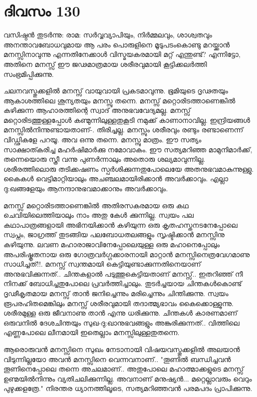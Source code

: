  
\section{ദിവസം 130}


വസിഷ്ഠന്‍ തുടര്‍ന്നു: രാമ: സര്‍വ്വവ്യാപിയും, നിര്‍മ്മലവും, ശാശ്വതവും അനന്താവബോധവുമായ ആ പരം പൊരുളിനെ മൂടുപടംകൊണ്ടു മറയ്ക്കാന്‍ മനസ്സിനാവുന്നു എന്നതിനേക്കാള്‍ വിസ്മയകരമായി മറ്റ്‌ എന്തുണ്ട്‌? എന്നിട്ടോ, അതിനെ മനസ്സ്‌ ഈ ജഢമാത്രമായ ശരീരവുമായി കൂട്ടിക്കലര്‍ത്തി സംഭ്രമിപ്പിക്കുന്നു.

ചലനവസ്തുക്കളില്‍ മനസ്സ്‌ വായുവായി പ്രകടമാവുന്നു. ഭൂമിയുടെ ദൃഢതയും ആകാശത്തിലെ ശൂന്യതയും മനസ്സു തന്നെ. മനസ്സ്‌ മറ്റൊരിടത്താണെങ്കില്‍ കഴിക്കുന്ന ആഹാരത്തിന്റെ സ്വാദ്‌ അനുഭവവേദ്യമല്ല. മനസ്സ്‌ മറ്റൊരിടത്തുള്ളപ്പോള്‍ കണ്മുന്നിലുള്ളതുകൂടി നമുക്ക്‌ കാണാനാവില്ല. ഇന്ദ്രിയങ്ങള്‍ മനസ്സില്‍നിന്നുണ്ടായതാണ്‌-. തിരിച്ചല്ല. മനസ്സും ശരീരവും രണ്ടും രണ്ടാണെന്ന് വിഡ്ഢികളേ പറയൂ. അവ ഒന്നു തന്നെ. മനസ്സു മാത്രം. ഈ സത്യം സാക്ഷാത്കരിച്ച മഹര്‍ഷിമാര്‍ക്കു നമോവാകം. ഈ സത്യമറിഞ്ഞ മാമുനിമാര്‍ക്ക്‌, തന്നെയൊരു സ്ത്രീ വന്നു പുണര്‍ന്നാലും അതൊരു ശല്യമാവുന്നില്ല. ശരീരത്തിലൊരു തടിക്കഷണം സ്പര്‍ശിക്കുന്നതുപോലെയേ അതനുഭവമാകുന്നുള്ളു. കൈകള്‍ വെട്ടിമാറ്റിയാലും അചഞ്ചലമായിരിക്കാന്‍ അവര്‍ക്കാവും. എല്ലാ ദു:ഖങ്ങളേയും ആനന്ദാനുഭവമാക്കാനും അവര്‍ക്കാവും.

മനസ്സ്‌ മറ്റൊരിടത്താണെങ്കില്‍ അതിരസകരമായ ഒരു കഥ ചെവിയിലെത്തിയാലും നാം അതു കേള്‍ ക്കുന്നില്ല. സ്വയം പല കഥാപാത്രങ്ങളായി അഭിനയിക്കാന്‍ കഴിയുന്ന ഒരു കൃതഹസ്തനടനേപ്പോലെ സ്വപ്നം, ജാഗ്രത്ത്‌ തുടങ്ങിയ പലബോധതലങ്ങളും സൃഷ്ടിക്കാന്‍ മനസ്സിനു കഴിയുന്നു. ലവണ മഹാരാജാവിനേപ്പോലെയുള്ള ഒരു മഹാനെപ്പോലും അപരിഷ്കൃതനായ ഒരു ഗോത്രവര്‍ഗ്ഗക്കാരനായി മാറ്റാന്‍ മനസ്സിനെത്രവേഗമാണു സാധിച്ചത്‌!!. മനസ്സ്‌ സ്വന്തമായി കെട്ടിയുണ്ടാക്കുന്നതിനെയാണ്‌ അനുഭവിക്കുന്നത്‌.. ചിന്തകളാല്‍ പടുത്തുകെട്ടിയതാണ്‌ മനസ്സ്‌.. ഇതറിഞ്ഞ്‌ നീ നിനക്ക്‌ ബോധിച്ചതുപോലെ പ്രവര്‍ത്തിച്ചാലും. തുടര്‍ച്ചയായ ചിന്തകള്‍കൊണ്ട്‌ ദൃഢീകൃതമായ മനസ്സ്‌ താന്‍ ജനിച്ചെന്നും മരിച്ചെന്നും ചിന്തിക്കുന്നു. സ്വയം രൂപരഹിതമെങ്കിലും മനസ്സ്‌ ശരീരവുമായി തദാത്മ്യഭാവം കൈക്കൊള്ളുന്നു. ശരീരമുള്ള ഒരു ജീവനാണു താന്‍ എന്നു ധരിക്കുന്നു. ചിന്തകള്‍ കാരണമാണ്‌ ഒരുവനില്‍ ദേശചിന്തയും സുഖ-ദു:ഖാനുഭവങ്ങളും അങ്കുരിക്കുന്നത്‌.. വിത്തിലെ എണ്ണപോലെ ലീനമായി ഇതെല്ലാം മനസ്സിലുള്ളതുതന്നെ.

ആരൊരുവന്‍ മനസ്സിനെ സുഖം നേടാനായി വിഷയവസ്തുക്കളില്‍ അലയാന്‍ വിടുന്നില്ലയോ അവന്‍ മനസ്സിനെ വെന്നവനാണ്‌.. "തൂണില്‍ ബന്ധിച്ചവന്‍ തൂണിനെപ്പോലെ തന്നെ അചലമാണ്‌.. അതുപോലെ മഹാത്മാക്കളുടെ മനസ്സ്‌ ഉണ്മയില്‍നിന്നും വ്യതിചലിക്കുന്നില്ല. അവനാണ്‌ മനുഷ്യന്‍... മറ്റെല്ലാവരും വെറും പുഴുക്കളത്രേ." നിരന്തര ധ്യാനത്തിലൂടെ, സത്യമറിഞ്ഞവന്‍ പരമപദം പ്രാപിക്കുന്നു. 

